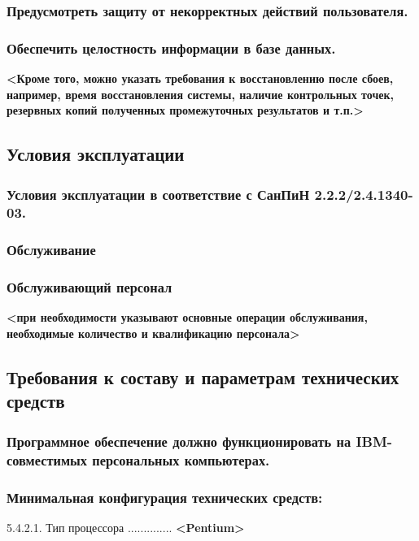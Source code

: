 \documentclass[utf8x, 12pt, oneside, a4paper]{article}
\begin{document}
	\subsubsection{Предусмотреть защиту от некорректных действий пользователя.}

	\subsubsection{\textbf{Обеспечить целостность информации в базе данных.}}
	\textbf{<Кроме того, можно указать требования к восстановлению после сбоев, например, время восстановления системы, наличие контрольных точек, резервных копий полученных промежуточных результатов и т.п.> }

	\subsection{Условия эксплуатации}

	\subsubsection{Условия эксплуатации в соответствие с СанПиН 2.2.2/2.4.1340-03.}
	
	\subsubsection{\textbf{Обслуживание}}

	\subsubsection{\textbf{Обслуживающий персонал}}

	\textbf{<при необходимости указывают основные операции обслуживания, необходимые количество и квалификацию персонала>}

	\subsection{Требования к составу и параметрам технических средств}


	\subsubsection{Программное обеспечение должно функционировать на IBM-совместимых персональных компьютерах.}

	\subsubsection{Минимальная конфигурация технических средств:}
	5.4.2.1. Тип процессора .............. \textbf{<Pentium>}
	
\end{document}
